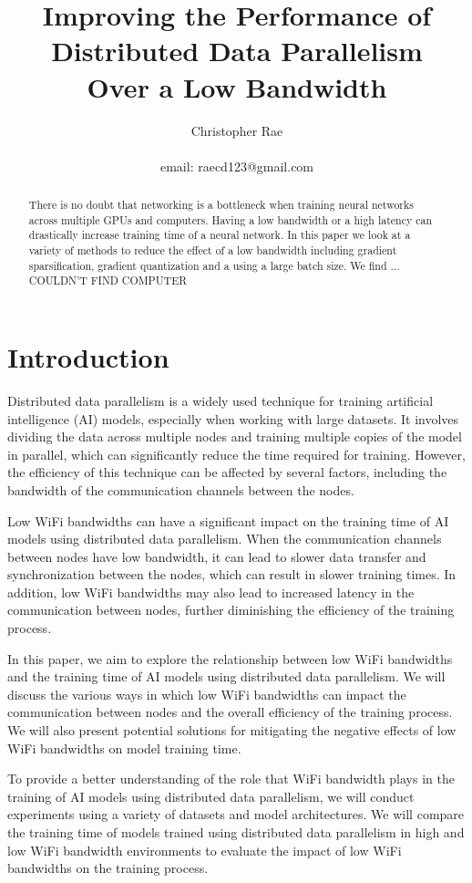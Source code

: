 \documentclass[11pt]{article}
\title{Improving the Performance of Distributed Data Parallelism \\Over a Low Bandwidth}
\author{Christopher Rae \\ \begin{small} email: raecd123@gmail.com \end{small}}
\date{}
\begin{document}
\maketitle


\begin{abstract}
There is no doubt that networking is a bottleneck when training neural networks across multiple GPUs and computers. Having a low bandwidth or a high latency can drastically increase training time of a neural network. In this paper we look at a variety of methods to reduce the effect of a low bandwidth including gradient sparsification, gradient quantization and a using a large batch size. We find ... COULDN'T FIND COMPUTER
\end{abstract}
\tableofcontents
\newpage

\section{Introduction}
Distributed data parallelism is a widely used technique for training artificial intelligence (AI) models, especially when working with large datasets. It involves dividing the data across multiple nodes and training multiple copies of the model in parallel, which can significantly reduce the time required for training. However, the efficiency of this technique can be affected by several factors, including the bandwidth of the communication channels between the nodes.

Low WiFi bandwidths can have a significant impact on the training time of AI models using distributed data parallelism. When the communication channels between nodes have low bandwidth, it can lead to slower data transfer and synchronization between the nodes, which can result in slower training times. In addition, low WiFi bandwidths may also lead to increased latency in the communication between nodes, further diminishing the efficiency of the training process.

In this paper, we aim to explore the relationship between low WiFi bandwidths and the training time of AI models using distributed data parallelism. We will discuss the various ways in which low WiFi bandwidths can impact the communication between nodes and the overall efficiency of the training process. We will also present potential solutions for mitigating the negative effects of low WiFi bandwidths on model training time.

To provide a better understanding of the role that WiFi bandwidth plays in the training of AI models using distributed data parallelism, we will conduct experiments using a variety of datasets and model architectures. We will compare the training time of models trained using distributed data parallelism in high and low WiFi bandwidth environments to evaluate the impact of low WiFi bandwidths on the training process.
\end{document}
